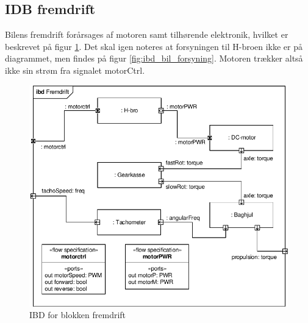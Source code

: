 \subsection{IDB fremdrift}

Bilens fremdrift forårsages af motoren samt tilhørende elektronik, hvilket er beskrevet på figur \ref{fig:ibd_fremdrift}. Det skal igen noteres at forsyningen til H-broen ikke er på diagrammet, men findes på figur \ref{fig:ibd_bil_forsyning}. Motoren trækker altså ikke sin strøm fra signalet motorCtrl. 

\begin{figure}[h]
\centering
\includegraphics[scale=1]{../fig/diagrammer/bil/ibd_fremdrift.pdf}
\caption{IBD for blokken fremdrift}
\label{fig:ibd_fremdrift}
\end{figure}